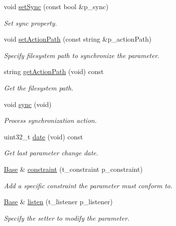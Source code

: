 \begin{DoxyCompactItemize}
void \hyperlink{classxtd_1_1servers_1_1param_1_1Base_a912fb989f6ecb224596add4d0b388102}{set\+Sync} (const bool \&p\+\_\+sync)
\begin{DoxyCompactList}\small\item\em Set sync property. \end{DoxyCompactList}\item 
void \hyperlink{classxtd_1_1servers_1_1param_1_1Base_a824470386f5a0f25824b6be50d15a38a}{set\+Action\+Path} (const string \&p\+\_\+action\+Path)
\begin{DoxyCompactList}\small\item\em Specify filesystem path to synchronize the parameter. \end{DoxyCompactList}\item 
string \hyperlink{classxtd_1_1servers_1_1param_1_1Base_a69c3c92644e04f22b9dba10095b0ed3b}{get\+Action\+Path} (void) const 
\begin{DoxyCompactList}\small\item\em Get the filesystem path. \end{DoxyCompactList}\item 
void \hyperlink{classxtd_1_1servers_1_1param_1_1Base_a74c2c5e1bac271ebbb80b93c1b976b47}{sync} (void)
\begin{DoxyCompactList}\small\item\em Process synchronization action. \end{DoxyCompactList}\item 
uint32\+\_\+t \hyperlink{classxtd_1_1servers_1_1param_1_1Base_a532c7d291a15c2d611af8ab9898239f2}{date} (void) const 
\begin{DoxyCompactList}\small\item\em Get last parameter change date. \end{DoxyCompactList}\item 
\hyperlink{classxtd_1_1servers_1_1param_1_1Base}{Base} \& \hyperlink{classxtd_1_1servers_1_1param_1_1Base_aeafea08d04f6c7af78014a4991f38b57}{constraint} (t\+\_\+constraint p\+\_\+constraint)
\begin{DoxyCompactList}\small\item\em Add a specific constraint the parameter must conform to. \end{DoxyCompactList}\item 
\hyperlink{classxtd_1_1servers_1_1param_1_1Base}{Base} \& \hyperlink{classxtd_1_1servers_1_1param_1_1Base_a819665d57d109485c4ba16352efc75e3}{listen} (t\+\_\+listener p\+\_\+listener)
\begin{DoxyCompactList}\small\item\em Specify the setter to modify the parameter. \end{DoxyCompactList}\item 

\end{DoxyCompactItemize}
